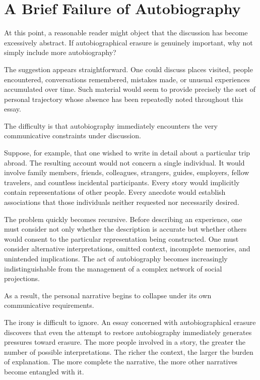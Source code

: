 \documentclass[11pt]{article}
\theoremstyle{plain}
\begin{document}
\section{A Brief Failure of Autobiography}

At this point, a reasonable reader might object that the discussion has become excessively abstract. If autobiographical erasure is genuinely important, why not simply include more autobiography?

The suggestion appears straightforward. One could discuss places visited, people encountered, conversations remembered, mistakes made, or unusual experiences accumulated over time. Such material would seem to provide precisely the sort of personal trajectory whose absence has been repeatedly noted throughout this essay.

The difficulty is that autobiography immediately encounters the very communicative constraints under discussion.

Suppose, for example, that one wished to write in detail about a particular trip abroad. The resulting account would not concern a single individual. It would involve family members, friends, colleagues, strangers, guides, employers, fellow travelers, and countless incidental participants. Every story would implicitly contain representations of other people. Every anecdote would establish associations that those individuals neither requested nor necessarily desired.

The problem quickly becomes recursive. Before describing an experience, one must consider not only whether the description is accurate but whether others would consent to the particular representation being constructed. One must consider alternative interpretations, omitted context, incomplete memories, and unintended implications. The act of autobiography becomes increasingly indistinguishable from the management of a complex network of social projections.

As a result, the personal narrative begins to collapse under its own communicative requirements.

The irony is difficult to ignore. An essay concerned with autobiographical erasure discovers that even the attempt to restore autobiography immediately generates pressures toward erasure. The more people involved in a story, the greater the number of possible interpretations. The richer the context, the larger the burden of explanation. The more complete the narrative, the more other narratives become entangled with it.
\end{document}
